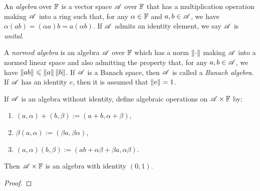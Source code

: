 \documentclass[reqno]{amsart}
\begin{document}
\begin{definition}
	An \emph{algebra} over $\mathbb{F}$ is a vector space $\mathscr{A}$ over $\mathbb{F}$ that has a multiplication operation making $\mathscr{A}$ into a ring such that, for any $\alpha \in \mathbb{F}$ and $a,b \in \mathscr{A}$, we have $\alpha(ab) = (\alpha a)b = a (\alpha b)$. If $\mathscr{A}$ admits an identity element, we say $\mathscr{A}$ is \emph{unital}.
\end{definition}

\begin{definition}
	A \emph{normed algebra} is an algebra $\mathscr{A}$ over $\mathbb{F}$ which has a norm $\left\lVert \cdot \right\rVert$ making $\mathscr{A}$ into a normed linear space and also admitting the property that, for any $a,b \in \mathscr{A}$, we have $\left\lVert ab \right\rVert \leqslant \left\lVert a \right\rVert \left\lVert b \right\rVert$. If $\mathscr{A}$ is a Banach space, then $\mathscr{A}$ is called a \emph{Banach algebra}. If $\mathscr{A}$ has an identity $e$, then it is assumed that $\left\lVert e \right\rVert = 1$.
\end{definition}

\begin{proposition}
	If $\mathscr{A}$ is an algebra without identity, define algebraic operations on $\mathscr{A} \times \mathbb{F}$ by:
	\mbox{}
	\begin{enumerate}[label = (\roman*),itemsep=1pt,topsep=3pt]
		\item $(a,\alpha) + (b,\beta) := (a+b,\alpha + \beta)$,
		\item $\beta(a,\alpha) := (\beta a, \beta \alpha)$,
		\item $(a,\alpha)(b,\beta) := (ab + \alpha \beta + \beta a, \alpha \beta)$.
	\end{enumerate}
	Then $\mathscr{A} \times \mathbb{F}$ is an algebra with identity $(0,1)$.
\end{proposition}
	{\color{red}
	\begin{proof}
			
	\end{proof}}
\end{document}
